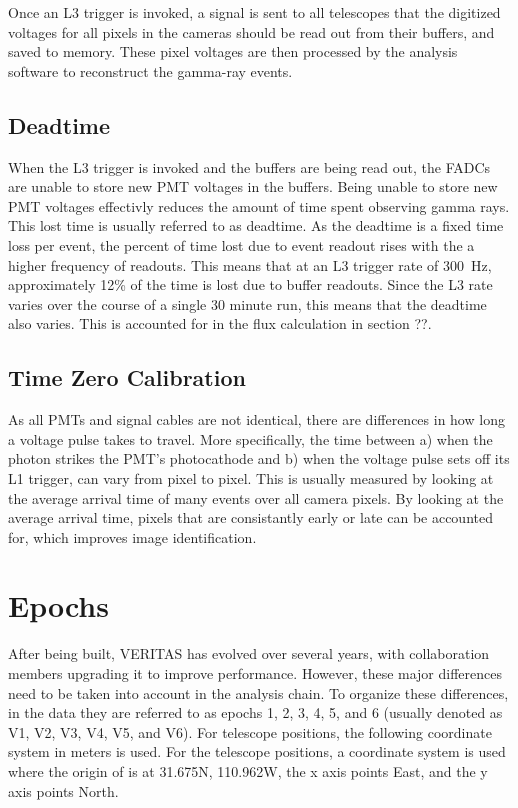 Once an L3 trigger is invoked, a signal is sent to all telescopes that the digitized voltages for all pixels in the cameras should be read out from their buffers, and saved to memory.
These pixel voltages are then processed by the analysis software to reconstruct the gamma-ray events.



\subsection{Deadtime}
When the L3 trigger is invoked and the buffers are being read out, the FADCs are unable to store new PMT voltages in the buffers.
Being unable to store new PMT voltages effectivly reduces the amount of time spent observing gamma rays.
This lost time is usually referred to as deadtime.
As the deadtime is a fixed time loss per event, the percent of time lost due to event readout rises with the a higher frequency of readouts.
This means that at an L3 trigger rate of \nicetilde{}\SI{300}{Hz}, approximately \nicetilde{}12\% of the time is lost due to buffer readouts.
Since the L3 rate varies over the course of a single 30 minute run, this means that the deadtime also varies.
This is accounted for in the flux calculation in {\color{red}section ??}.

\subsection{Time Zero Calibration}
As all PMTs and signal cables are not identical, there are differences in how long a voltage pulse takes to travel.
More specifically, the time between a) when the photon strikes the PMT's photocathode and b) when the voltage pulse sets off its L1 trigger, can vary from pixel to pixel.
This is usually measured by looking at the average arrival time of many events over all camera pixels.
By looking at the average arrival time, pixels that are consistantly early or late can be accounted for, which improves image identification.

\section{Epochs}\label{sec:epochs}
After being built, VERITAS has evolved over several years, with collaboration members upgrading it to improve performance.
However, these major differences need to be taken into account in the analysis chain.
To organize these differences, in the data they are referred to as epochs 1, 2, 3, 4, 5, and 6 (usually denoted as V1, V2, V3, V4, V5, and V6).
For telescope positions, the following coordinate system in meters is used.
For the telescope positions, a coordinate system is used where the origin of is at 31.675N, 110.962W, the x axis points East, and the y axis points North.

